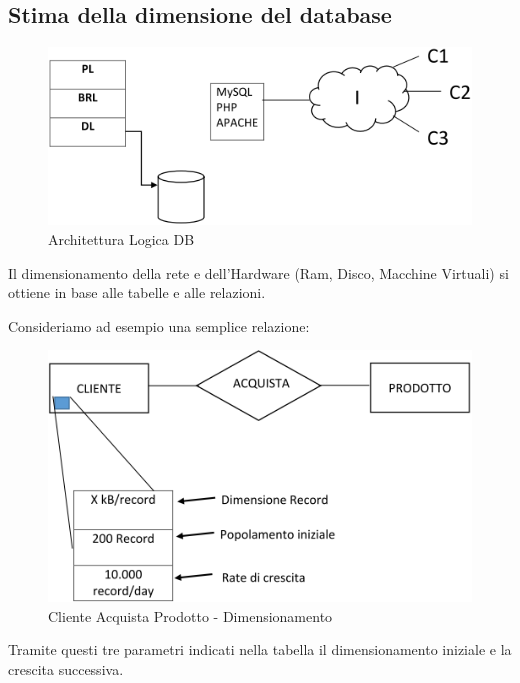 \subsection{Stima della dimensione del database}


\begin{center}
\begin{figure}[H]
\centering
\includegraphics[scale=0.8]{figures/db_arch.png}
\caption{Architettura Logica DB}
\end{figure}
\end{center}

Il dimensionamento della rete e dell’Hardware (Ram, Disco, Macchine Virtuali) si ottiene in base alle tabelle e alle relazioni. 
  
Consideriamo ad esempio una semplice relazione:   

\begin{center}
\begin{figure}[H]
\centering
\includegraphics[scale=1]{figures/cap_dimensioning.png}
\caption{Cliente Acquista Prodotto - Dimensionamento}
\end{figure}
\end{center}

Tramite questi tre parametri indicati nella tabella il dimensionamento iniziale e la crescita successiva.

